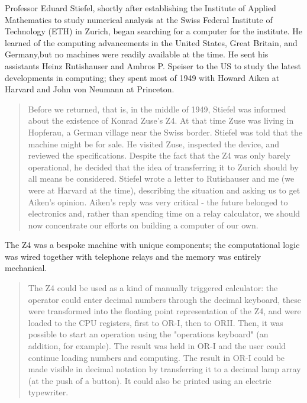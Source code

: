 Professor Eduard Stiefel, shortly after establishing the
Institute of Applied Mathematics to study numerical analysis at the Swiss
Federal Institute of Technology (ETH) in Zurich, began searching for a computer
for the institute. He learned of the computing advancements in the United
States, Great Britain, and Germany,but no machines were readily available at
the time. He sent his assistants Heinz Rutishauser and Ambros P. Speiser to the
US to study the latest developments in computing; they spent most of 1949
with Howard Aiken at Harvard and John von Neumann at Princeton.

\begin{quotation}
	Before we returned, that is, in the middle of 1949, Stiefel was informed
	about the existence of Konrad Zuse's Z4. At that time Zuse was living in
	Hopferau, a German village near the Swiss border. Stiefel was told that the
	machine might be for sale. He visited Zuse, inspected the device, and reviewed
	the specifications. Despite the fact that the Z4 was only barely
	operational, he
	decided that the idea of transferring it to Zurich should by all means be
	considered. Stiefel wrote a letter to Rutishauser and me (we were at Harvard at the time),
	describing the situation and asking us to get Aiken's opinion.
	Aiken's reply was very critical - the future belonged to electronics
	and, rather
	than spending time on a relay calculator, we should now concentrate our efforts
	on building a computer of our own.
	\cite{konrad-zuses-z4-2000}
\end{quotation}

The Z4 was a bespoke machine with unique components; the computational logic
was wired together with telephone relays and the memory was entirely mechanical.

\begin{quotation}
	The Z4 could be used as a kind of manually triggered calculator: the
	operator could enter decimal numbers through the decimal keyboard, these
	were transformed into the floating point representation of the Z4, and were
	loaded to the CPU registers, first to OR-I, then to ORII. Then, it was possible
	to start an operation using the "operations keyboard" (an addition, for
	example). The result was held in OR-I and the user could continue loading
	numbers and computing. The result in OR-I could be made visible in decimal
	notation by transferring it to a decimal lamp array (at the push of a button).
	It could also be printed using an electric typewriter.
	\cite{architecture-of-konrad-zuses-z4-computer-2021}
\end{quotation}

